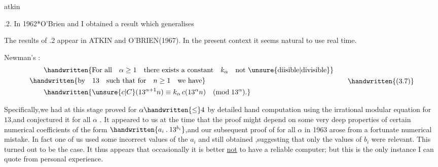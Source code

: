 \noindent\hfill atkin  

\noindent{}.2. In 1962*O'Brien and I obtained a result which generalises

\noindent\handwritten{\rule{\linewidth}{0.4pt}}

\noindent *The results of \handwritten{\S}.2 appear in ATKIN and O'BRIEN(1967). In the present context it seems natural to use real time.

\noindent\handwritten{\rule{\linewidth}{0.4pt}}

\noindent Newman's :
\[
\begin{aligned}
&\qquad\handwritten{\text{For all}\quad\alpha\geq1\quad\text{there exists a constant}\quad k_{\alpha}\quad\text{not \unsure{diisible|divisible}}}\\
&\handwritten{\text{by}\quad13\quad\text{such that for}\quad n\geq1\quad\text{we have}}\\
&\qquad\handwritten{\unsure{c|C}(13^{\alpha+1}n)\equiv k_{\alpha}\,c(13^{\alpha}n)\quad(\mathrm{mod}\;13^{\alpha}).}
\end{aligned}
\tag*{\handwritten{(3.7)}}
\]

\noindent Specifically,we had at this stage proved  for $\alpha\handwritten{\leq}4$ by detailed hand computation using the irrational modular equation for $13$,and conjectured it for all $\alpha$ . It appeared to us at the time that the proof might depend on some very deep properties of certain numerical coefficients of the form $\handwritten{a_{i}\mathbin{.}13^{b_{i}}}$,and our subsequent proof of  for all $\alpha$ in 1963 arose from a fortunate numerical mistake. In fact one of us used \unsure{\textquotesingle}some incorrect values of the \uline{$a_{i}$} and still obtained ,suggesting that only the values of \uline{$b_{i}$} were relevant. This turned out to be the case. It thus appears that occasionally it is better \uline{not} to have a reliable computer; but this is the only instance I can quote from personal experience.

